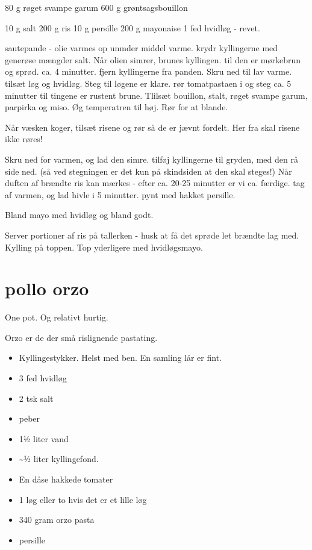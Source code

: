 \documentclass[
]{book}
\providecommand{\tightlist}{%
  \setlength{\itemsep}{0pt}\setlength{\parskip}{0pt}}
\begin{document}
80 g røget svampe garum
600 g grøntsagsbouillon

10 g salt
200 g ris
10 g persille
200 g mayonaise
1 fed hvidløg - revet.

sautepande - olie varmes op unmder middel varme. krydr kyllingerne med generøse mængder
salt. Når olien simrer, brunes kyllingen. til den er mørkebrun og sprød. ca. 4 minutter.
fjern kyllingerne fra panden. Skru ned til lav varme.
tilsæt løg og hvidløg. Steg til løgene er klare.
rør tomatpastaen i og steg ca. 5 minutter til tingene er rustent brune.
Tlilsæt bouillon, stalt, røget svampe garum, parpirka og miso. Øg temperatren til høj. Rør for at
blande.

Når væsken koger, tilsæt risene og rør så de er jævnt fordelt. Her fra skal risene ikke røres!

Skru ned for varmen, og lad den simre. tilføj kyllingerne til gryden, med den rå side ned. (så ved stegningen
er det kun på skindsiden at den skal steges!) Når duften af brændte ris kan mærkes - efter ca. 20-25 minutter
er vi ca. færdige. tag af varmen, og lad hivle i 5 minutter. pynt med hakket persille.

Bland mayo med hvidløg og bland godt.

Server portioner af ris på tallerken - husk at få det sprøde let brændte lag med. Kylling på toppen.
Top yderligere med hvidløgsmayo.

\hypertarget{pollo-orzo}{%
\section{pollo orzo}\label{pollo-orzo}}

One pot. Og relativt hurtig.

Orzo er de der små rislignende pastating.

\begin{itemize}
\tightlist
\item
  Kyllingestykker. Helst med ben. En samling lår er fint.
\item
  3 fed hvidløg
\item
  2 tsk salt
\item
  peber
\item
  1½ liter vand
\item
  \textasciitilde½ liter kyllingefond.
\item
  En dåse hakkede tomater
\item
  1 løg eller to hvis det er et lille løg
\item
  340 gram orzo pasta
\item
  persille
\end{itemize}
\end{document}
